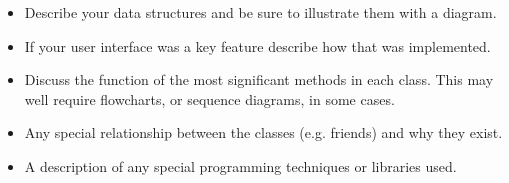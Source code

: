 \begin{itemize}
\item Describe your data structures and be sure to illustrate them
  with a diagram.

\item If your user interface was a key feature describe how that was
  implemented.

\item Discuss the function of the most significant methods in each
  class. This may well require flowcharts, or sequence diagrams, in
  some cases.

\item Any special relationship between the classes (e.g. friends) and
  why they exist.

\item A description of any special programming techniques or libraries
  used.
\end{itemize}